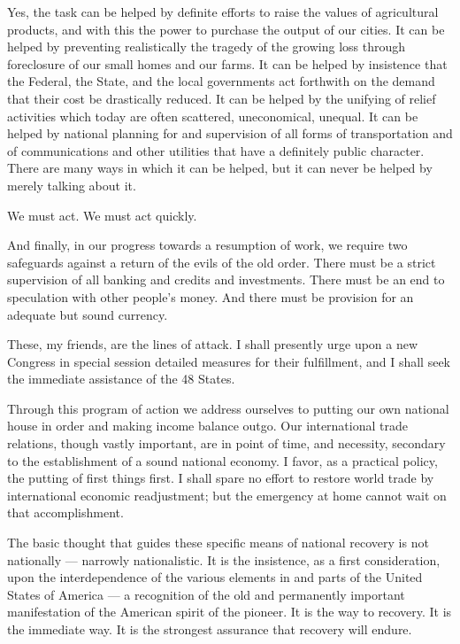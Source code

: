 \documentclass[a4paper]{amsbook}
\begin{document}
Yes, the task can be helped by definite efforts to raise the values of agricultural products, and with this the power to purchase the output of our cities. It can be helped by preventing realistically the tragedy of the growing loss through foreclosure of our small homes and our farms. It can be helped by insistence that the Federal, the State, and the local governments act forthwith on the demand that their cost be drastically reduced. It can be helped by the unifying of relief activities which today are often scattered, uneconomical, unequal. It can be helped by national planning for and supervision of all forms of transportation and of communications and other utilities that have a definitely public character. There are many ways in which it can be helped, but it can never be helped by merely talking about it.

We must act. We must act quickly.

And finally, in our progress towards a resumption of work, we require two safeguards against a return of the evils of the old order. There must be a strict supervision of all banking and credits and investments. There must be an end to speculation with other people's money. And there must be provision for an adequate but sound currency.

These, my friends, are the lines of attack. I shall presently urge upon a new Congress in special session detailed measures for their fulfillment, and I shall seek the immediate assistance of the 48 States.

Through this program of action we address ourselves to putting our own national house in order and making income balance outgo. Our international trade relations, though vastly important, are in point of time, and necessity, secondary to the establishment of a sound national economy. I favor, as a practical policy, the putting of first things first. I shall spare no effort to restore world trade by international economic readjustment; but the emergency at home cannot wait on that accomplishment.

The basic thought that guides these specific means of national recovery is not nationally — narrowly nationalistic. It is the insistence, as a first consideration, upon the interdependence of the various elements in and parts of the United States of America — a recognition of the old and permanently important manifestation of the American spirit of the pioneer. It is the way to recovery. It is the immediate way. It is the strongest assurance that recovery will endure.
\end{document}
